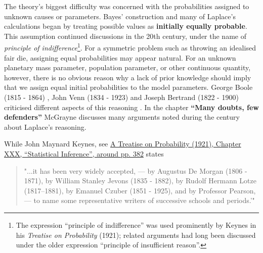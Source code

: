 The theory's biggest difficulty was concerned with the probabilities assigned to unknown causes or parameters. Bayes' construction and many of Laplace's calculations began by treating possible values as \textbf{initially equally probable}. This assumption continued discussions in the 20th century, under the name of \textit{principle of indifference}\footnote{The expression ``principle of indifference'' was used prominently by Keynes in his \textit{Treatise on Probability} (1921); related arguments had long been discussed under the older expression ``principle of insufficient reason''.}. For a symmetric problem such as throwing an idealised fair die, assigning equal probabilities may appear natural. For an unknown planetary mass parameter, population parameter, or other continuous quantity, however, there is no obvious reason why a lack of prior knowledge should imply that we assign equal initial probabilities to the model parameters. George Boole (1815 - 1864) , John Venn (1834 - 1923) and Joseph Bertrand (1822 - 1900) criticised different aspects of this reasoning \cite{boole1854,venn1866,bertrand1889}. In the chapter \textbf{``Many doubts, few defenders''} \cite{mcgrayne2011} McGrayne discusses many arguments noted during the century about Laplace's reasoning.  

While John Maynard Keynes, see \href{https://archive.org/details/treatiseonprobab007528mbp/page/382/mode/2up}{A Treatise on Probability (1921), Chapter XXX, “Statistical Inference”, around pp. 382} states 

\begin{quote}
"...it has been very widely accepted, — by Augustus De Morgan (1806 - 1871), by William Stanley Jevons (1835 - 1882), by Rudolf Hermann Lotze (1817–1881), by Emanuel Czuber (1851 - 1925), and by Professor Pearson, — to name some representative writers of successive schools and periods.'"\cite{keynes1921,mcgrayne2011}
\cite{mcgrayne2011}
\end{quote}

 

